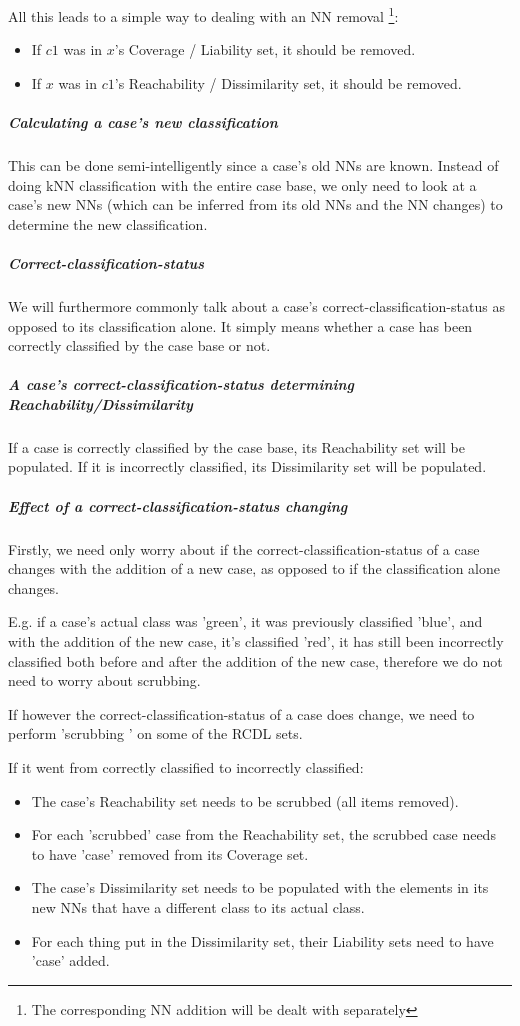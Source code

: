 \documentclass[a4paper,11pt]{report}
\begin{document}
All this leads to a simple way to dealing with an NN removal \footnote{The corresponding NN addition will be dealt with separately}:
\begin{itemize}
	\item If $c1$ was in $x$'s Coverage / Liability set, it should be removed.
	\item If $x$ was in $c1$'s Reachability / Dissimilarity set, it should be removed.
\end{itemize}

\subparagraph{Calculating a case's new classification}
This can be done semi-intelligently since a case's old NNs are known. Instead of doing kNN classification with the entire case base, we only need to look at a case's new NNs (which can be inferred from its old NNs and the NN changes) to determine the new classification.

\subparagraph{Correct-classification-status}
We will furthermore commonly talk about a case's correct-classification-status as opposed to its classification alone. It simply means whether a case has been correctly classified by the case base or not. 

\subparagraph{A case's correct-classification-status determining Reachability/Dissimilarity}
If a case is correctly classified by the case base, its Reachability set will be populated. If it is incorrectly classified, its Dissimilarity set will be populated.
 
\subparagraph{Effect of a correct-classification-status changing}
Firstly, we need only worry about if the correct-classification-status of a case changes with the addition of a new case, as opposed to if the classification alone changes.

E.g. if a case's actual class was 'green', it was previously classified 'blue', and with the addition of the new case, it's classified 'red', it has still been incorrectly classified both before and after the addition of the new case, therefore we do not need to worry about scrubbing.

If however the correct-classification-status of a case does change, we need to perform 'scrubbing ' on some of the RCDL sets.

If it went from correctly classified to incorrectly classified:
\begin{itemize}
	\item The case's Reachability set needs to be scrubbed (all items removed).
	\item For each 'scrubbed' case from the Reachability set, the scrubbed case needs to have 'case' removed from its Coverage set.
	\item The case's Dissimilarity set needs to be populated with the elements in its new NNs that have a different class to its actual class.
	\item For each thing put in the Dissimilarity set, their Liability sets need to have 'case' added.
\end{itemize}
\end{document}
